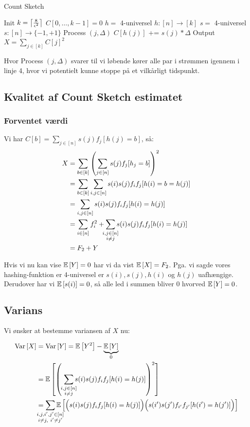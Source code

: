 \begin{algorithm}[H] \caption{Count Sketch} \label{alg:bcs}
  \nonl Init\;
  $k = \left\lceil \frac{8}{\epsilon^2} \right\rceil$\;
  $C[0, \dots, k-1] = 0$\;
  $h =$ 4-universel $h : [n] \rightarrow [k]$\;
  $s =$ 4-universel $s : [n] \rightarrow \{-1, +1 \}$\;
  \nonl Process $(j, \Delta)$\;
  $C[h(j)]$ += $s(j) * \Delta$\;
  \nonl Output\;
  \Return $X = \sum_{j \in [k]} C[j]^2$
\end{algorithm}\vspace{1em}

Hvor Process $(j, \Delta)$ svarer til vi løbende kører alle par i strømmen igennem i linje 4, hvor vi potentielt kunne stoppe på et vilkårligt tidspunkt.

\subsection{Kvalitet af Count Sketch estimatet}

\subsubsection{Forventet værdi}

Vi har $C[b] = \sum_{j \in [n]} s(j) f_j [h(j) = b]$, så:
\begin{align*}
  X
  &= \sum_{b \in [k]} \p{ \sum_{j \in [n]} s(j) f_j [h_j = b] }^2\\
  &= \sum_{b \in [k]} \sum_{i,j \in [n]} s(i) s(j) f_i f_j [h(i) = b = h(j)]\\
  &= \sum_{i,j \in [n]} s(i)s(j) f_i f_j [h(i) = h(j)]\\
  &= \sum_{i \in [n]} f_i^2 + \summ{i,j \in [n]\\ i \neq j} s(i) s(j) f_i f_j [h(i) = h(j)]\\
  &= F_2 + Y
\end{align*}

Hvis vi nu kan vise $\mathbb{E} \left[  Y  \right] = 0$ har vi da vist $\mathbb{E} \left[  X  \right] = F_2$. Pga. vi sagde vores hashing-funktion er 4-universel er $s(i), s(j), h(i)$ og $h(j)$ uafhængige. Derudover har vi $\mathbb{E} \left[  s(i)  \right] = 0$, så alle led i summen bliver 0 hvorved $\mathbb{E} \left[  Y  \right] = 0$.

\subsection{Varians}
Vi ønsker at bestemme variansen af $X$ nu:

\begin{align}
  \Var{X}
  &= \Var{Y} = \E{Y^2} - \underbrace{\E{Y}}_{0} \nonumber \\
  &= \E{\p{ \ \summ{i, j \in [n]\\ i \neq j} s(i) s(j) f_i f_j [h(i) = h(j)]  }^2} \nonumber \\
  &= \summ{i, j, i', j' \in [n]\\ i \neq j, \ i' \neq j'} \E{ \pBig{s(i) s(j) f_i f_j [h(i) = h(j)]} \pBig{s(i') s(j') f_{i'} f_{j'} [h(i') = h(j')]  } } \label{eq:monster-sum}
\end{align}

